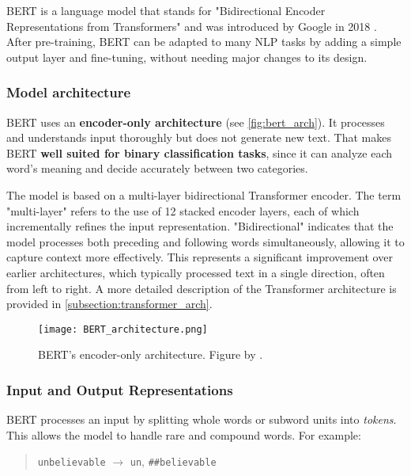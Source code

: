     \noindent BERT is a language model that stands for "Bidirectional Encoder Representations from Transformers" and was introduced by Google in 2018 \citep{devlinBERTPretrainingDeep2019}. After pre-training, BERT can be adapted to many NLP tasks by adding a simple output layer and fine-tuning, without needing major changes to its design.

\subsubsection{Model architecture}
    BERT uses an \textbf{encoder-only architecture} (see \autoref{fig:bert_arch}). It processes and understands input thoroughly but does not generate new text. That makes BERT \textbf{well suited for binary classification tasks}, since it can analyze each word’s meaning and decide accurately between two categories.

    The model is based on a multi-layer bidirectional Transformer encoder. The term "multi-layer" refers to the use of 12 stacked encoder layers, each of which incrementally refines the input representation. "Bidirectional" indicates that the model processes both preceding and following words simultaneously, allowing it to capture context more effectively. This represents a significant improvement over earlier architectures, which typically processed text in a single direction, often from left to right. A more detailed description of the Transformer architecture is provided in \autoref{subsection:transformer_arch}.

\begin{figure}
    \centering
	\texttt{[image: BERT\_architecture.png]}	
    \caption{BERT's encoder-only architecture. Figure by \citet{smithCompleteGuideBERT2024}.}
    \label{fig:bert_arch}
\end{figure}

\subsubsection{Input and Output Representations}
BERT processes an input by splitting whole words or subword units into \textit{tokens}. This allows the model to handle rare and compound words. For example:

\begin{quote}
    \texttt{unbelievable} $\rightarrow$ \texttt{un}, \texttt{\#\#believable}
\end{quote}

